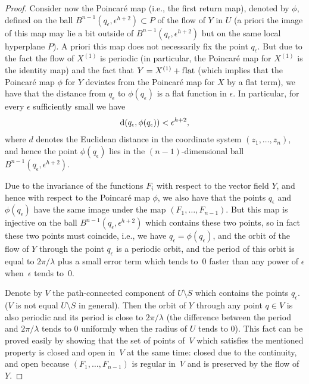 \documentclass[11pt]{article}
\numberwithin{equation}{section}
\begin{document}
\begin{proof}
Consider now the Poincar\'e map (i.e., the f\/irst return map), denoted by $\phi$,
def\/ined on the ball $B^{n-1}(q_\epsilon, \epsilon^{h+2}) \subset P$
of the f\/low of $Y$ in $U$
(a priori the image of this map may lie a bit outside of
$B^{n-1}(q_\epsilon, \epsilon^{h+2})$ but on the same
local hyperplane $P$). A priori this map does not necessarily f\/ix
the point $q_\epsilon$. But due to the fact the f\/low of $X^{(1)}$ is
periodic (in particular, the Poincar\'e map for $X^{(1)}$ is the identity map)
and the fact that $Y = X^{(1)} + \text{f\/lat}$ (which implies that the
Poincar\'e map $\phi$ for $Y$ deviates from the Poincar\'e map for $X$ by a
f\/lat term), we have that the distance from $q_\epsilon$ to
$\phi(q_\epsilon)$ is a f\/lat function in $\epsilon$. In particular,
for every $\epsilon$ suf\/f\/iciently small we have
\begin{gather*}
{\rm d}(q_\epsilon , \phi(q_\epsilon)) < \epsilon^{h+2},\end{gather*}
where $d$ denotes the Euclidean distance in the coordinate system $(z_1,\dots, z_n)$, and hence the point
$\phi(q_\epsilon)$ lies in the
$(n-1)$-dimensional ball $B^{n-1}(q_\epsilon, \epsilon^{h+2})$.

Due to the invariance of the functions $F_i$ with respect to
the vector f\/ield $Y$,
and hence with respect to the Poincar\'e map $\phi$, we also have that
the points $q_\epsilon$ and $\phi(q_\epsilon)$ have the same image
under the map $(F_1,\dots,F_{n-1})$. But this map is injective on the ball $B^{n-1}(q_\epsilon, \epsilon^{h+2})$
which contains these two points, so in fact these two points must coincide,
i.e., we have $q_\epsilon = \phi(q_\epsilon)$,
and the orbit of the f\/low of $Y$ through the point $q_\epsilon$ is a periodic orbit, and the period of this orbit
is equal to $2\pi/\lambda$ plus a small error term which tends to~0 faster
than any power of $\epsilon$ when~$\epsilon$ tends to~0.

Denote by $V$ the path-connected component of $U \setminus S$ which contains the points $q_\epsilon$. ($V$ is not equal $U \setminus S$ in general). Then
the orbit of $Y$ through any point $q \in V$ is also periodic and its period is close to $2\pi/\lambda$
(the dif\/ference between the period and $2\pi/\lambda$ tends to 0 uniformly when the radius of $U$ tends to 0). This
fact can be proved easily by showing that the set of points of~$V$ which satisf\/ies the mentioned property is closed
and open in~$V$ at the same time: closed due to the continuity, and open because $(F_1,\dots,F_{n-1})$
is regular in~$V$ and is preserved by the f\/low of~$Y$.


\end{proof}
\end{document}
